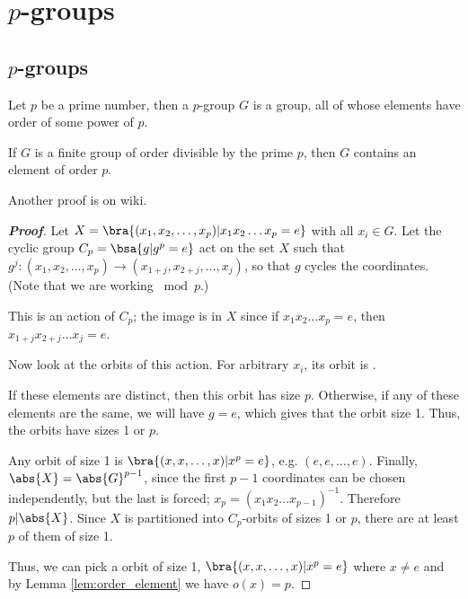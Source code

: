 \section{$p$-groups}%

\subsection{$p$-groups}

\begin{definition}[$p$-group]\label{def:p_group}
Let $p$ be a prime number, then a $p$-group $G$ is a group, all of whose elements have order of some power of $p$.
\end{definition}

\begin{theorem}\label{thm:cauchy_group}
If $G$ is a finite group of order divisible by the prime $p$, then $G$ contains an element of order $p$.
\end{theorem}

\begin{remark}
Another proof is on wiki.
\end{remark}

\begin{proof}[\bf Proof]
Let $X=\bra{(x_1,x_2,\dots,x_p)|x_1x_2\dots x_p = e}$ with all $x_i \in G$. Let the cyclic group $C_p = \bsa{g|g^p =e}$ act on the set $X$ such that $g^j:(x_1,x_2,\dots,x_p) \to (x_{1+j},x_{2+j},\dots, x_j)$, so that $g$ cycles the coordinates. (Note that we are working $\bmod p$.)

This is an action of $C_p$; the image is in $X$ since if $x_1x_2\dots x_p = e$, then $x_{1+j}x_{2+j}\dots x_j = e$.

Now look at the orbits of this action. For arbitrary $x_i$, its orbit is
\be
{}.
\ee

If these elements are distinct, then this orbit has size $p$. Otherwise, if any of these elements are the same, we will have $g =e$, which gives that the orbit size 1. Thus, the orbits have sizes 1 or $p$.

Any orbit of size 1 is $\bra{(x,x,\dots, x)|x^p =e}$, e.g. $(e,e,\dots,e)$. Finally, $\abs{X} = \abs{G}^{p-1}$, since the first $p-1$ coordinates can be chosen independently, but the last is forced; $x_p = (x_1x_2\dots x_{p-1})^{-1}$. Therefore $p|\abs{X}$. Since $X$ is partitioned into $C_p$-orbits of sizes 1 or $p$, there are at least $p$ of them of size 1.

Thus, we can pick a orbit of size 1, $\bra{(x,x,\dots, x)|x^p =e}$ where $x\neq e$ and by Lemma \ref{lem:order_element} we have $o(x) = p$.
\end{proof}

